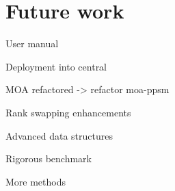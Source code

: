 \section{Future work}
\label{Conclusions:Future}

User manual

Deployment into central

MOA refactored -> refactor moa-ppsm

Rank swapping enhancements

Advanced data structures

Rigorous benchmark

More methods